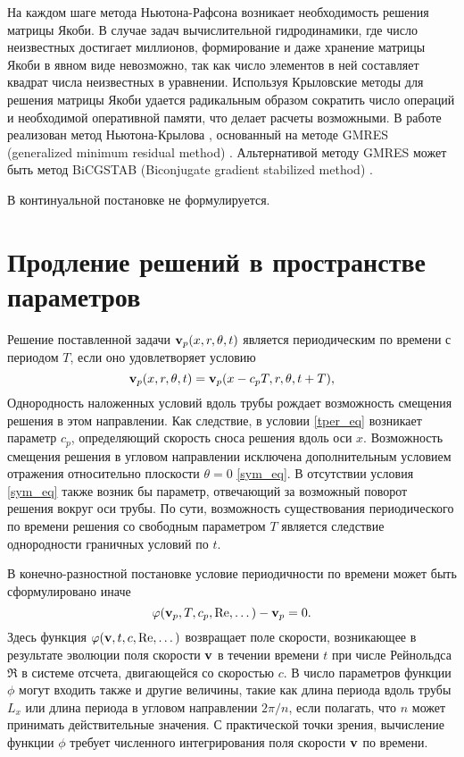 На каждом шаге метода Ньютона-Рафсона возникает необходимость решения матрицы Якоби. В случае задач вычислительной гидродинамики, где число неизвестных достигает миллионов, формирование и даже хранение матрицы Якоби в явном виде невозможно, так как число элементов в ней составляет квадрат числа неизвестных в уравнении. Используя Крыловские методы для решения матрицы Якоби удается радикальным образом сократить число операций и необходимой оперативной памяти, что делает расчеты возможными. В работе реализован метод Ньютона-Крылова \cite{}, основанный на методе GMRES (generalized minimum residual method) \cite{Saad1986}. Альтернативой методу GMRES может быть метод BiCGSTAB (Biconjugate gradient stabilized method) \cite{Sleijpen1993}. 

В континуальной постановке не формулируется. 

\section{Продление решений в пространстве параметров}

Решение поставленной задачи $\mathbf{v}_p(x,r,\theta,t)$ является периодическим по времени с периодом $T$, если оно удовлетворяет условию
\begin{equation} \label{tper_eq}
\mathbf{v}_p(x,r,\theta,t) = \mathbf{v}_p(x - c_p T, r, \theta, t + T),
\end{equation}
Однородность наложенных условий вдоль трубы рождает возможность смещения решения в этом направлении. Как следствие, в условии \eqref{tper_eq} возникает параметр $c_p$, определяющий скорость сноса решения вдоль оси $x$. Возможность смещения решения в угловом направлении исключена дополнительным условием отражения относительно плоскости $\theta = 0$ \eqref{sym_eq}. В отсутствии условия \eqref{sym_eq} также возник бы параметр, отвечающий за возможный поворот решения вокруг оси трубы. По сути, возможность существования периодического по времени решения со свободным параметром $T$ является следствие однородности граничных условий по $t$. 

В конечно-разностной постановке условие периодичности по времени может быть сформулировано иначе
\begin{equation}\label{P_eq}
\varphi(\mathbf{v}_p, T, c_p, \operatorname{Re}, \dots) - \mathbf{v}_p = 0.
\end{equation}
Здесь функция $\varphi(\mathbf{v}, t, c, \operatorname{Re}, \dots)$ возвращает поле скорости, возникающее в результате эволюции поля скорости $\mathbf{v}$ в течении времени $t$ при числе Рейнольдса $\Re$ в системе отсчета, двигающейся со скоростью $c$. В число параметров функции $\phi$ могут входить также и другие величины, такие как длина периода вдоль трубы $L_x$ или длина периода в угловом направлении $2\pi/n$, если полагать, что $n$ может принимать действительные значения. С практической точки зрения, вычисление функции $\phi$ требует численного интегрирования поля скорости $\mathbf{v}$ по времени. 

